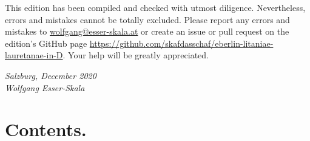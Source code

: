 \documentclass[parskip=full]{scrreprt}
\newif\iftemplate\templatetrue
\begin{document}
This edition has been compiled and checked with utmost diligence. Nevertheless, errors and mistakes cannot be totally excluded. Please report any errors and mistakes to \url{wolfgang@esser-skala.at} or create an issue or pull request on the edition’s GitHub page \url{https://github.com/skafdasschaf/eberlin-litaniae-lauretanae-in-D}. Your help will be greatly appreciated.

\bigskip
\textit{Salzburg, December 2020\\
Wolfgang Esser-Skala}

\cleardoublepage
\chapter*{Contents.}


\cleardoublepage
\fi

\iftemplate

\fi
\end{document}
